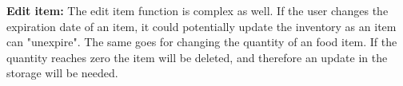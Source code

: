 \begin{table}[H]
\begin{flushleft}
    \textbf{Edit item:} The edit item function is complex as well. If the user changes the expiration date of an item, it could potentially update the inventory as an item can "unexpire". The same goes for changing the quantity of an food item. If the quantity reaches zero the item will be deleted, and therefore an update in the storage will be needed.
  \end{flushleft}
\end{table}